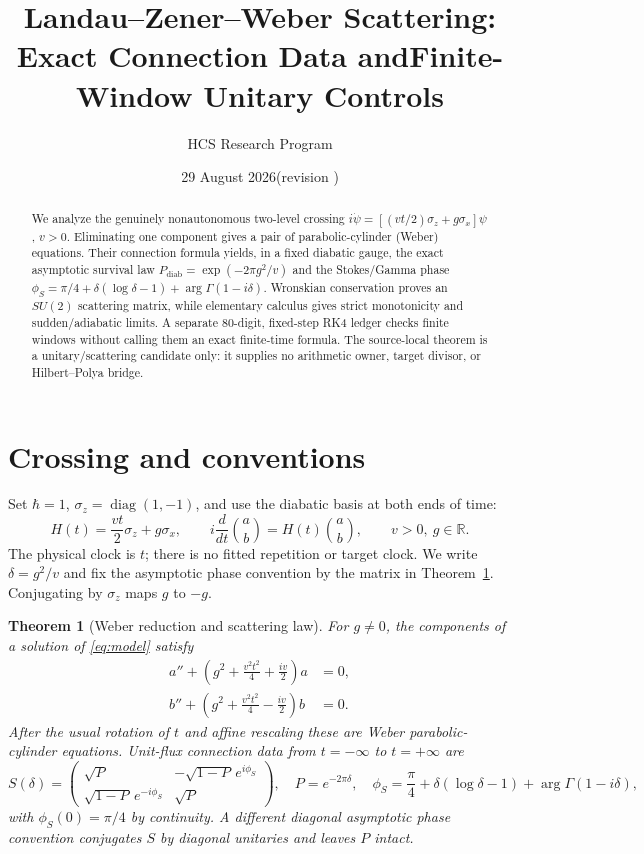 \documentclass[10pt]{article}
\title{Landau--Zener--Weber Scattering: Exact Connection Data and\newline Finite-Window Unitary Controls}
\author{HCS Research Program}
\date{29 August 2026\quad (revision \CRevisionRound)}
\newtheorem{theorem}{Theorem}
\newcommand{\diab}{\mathrm{diab}}
\begin{document}
\maketitle

\begin{abstract}
We analyze the genuinely nonautonomous two-level crossing
$i\dot\psi=[(vt/2)\sigma_z+g\sigma_x]\psi$, $v>0$.  Eliminating one
component gives a pair of parabolic-cylinder (Weber) equations.  Their
connection formula yields, in a fixed diabatic gauge, the exact asymptotic
survival law $P_\diab=\exp(-2\pi g^2/v)$ and the
Stokes/Gamma phase
$\phi_S=\pi/4+\delta(\log\delta-1)+\arg\Gamma(1-i\delta)$.
Wronskian conservation proves an $SU(2)$ scattering matrix, while elementary
calculus gives strict monotonicity and sudden/adiabatic limits.  A separate
80-digit, fixed-step RK4 ledger checks finite windows without calling them an
exact finite-time formula.  The source-local theorem is a unitary/scattering
candidate only: it supplies no arithmetic owner, target divisor, or
Hilbert--Polya bridge.
\end{abstract}

\section{Crossing and conventions}
Set $\hbar=1$, $\sigma_z=\operatorname{diag}(1,-1)$, and use the diabatic
basis at both ends of time:
\begin{equation}
 H(t)=\frac{vt}{2}\sigma_z+g\sigma_x,
 \qquad i\frac{d}{dt}\binom{a}{b}=H(t)\binom{a}{b},
 \qquad v>0,\ g\in\mathbb R .                         \label{eq:model}
\end{equation}
The physical clock is $t$; there is no fitted repetition or target clock.  We
write $\delta=g^2/v$ and fix the asymptotic phase convention by the matrix in
Theorem~\ref{thm:scattering}.  Conjugating by $\sigma_z$ maps $g$ to $-g$.

\begin{theorem}[Weber reduction and scattering law]\label{thm:scattering}
For $g\ne0$, the components of a solution of \eqref{eq:model} satisfy
\begin{align}
 a''+\left(g^2+\frac{v^2t^2}{4}+\frac{iv}{2}\right)a&=0,\\
 b''+\left(g^2+\frac{v^2t^2}{4}-\frac{iv}{2}\right)b&=0.               \label{eq:weber}
\end{align}
After the usual rotation of $t$ and affine rescaling these are Weber
parabolic-cylinder equations.  Unit-flux connection data from $t=-\infty$ to
$t=+\infty$ are
\begin{equation}
 S(\delta)=\begin{pmatrix}
 \sqrt P&-\sqrt{1-P}\,e^{i\phi_S}\\
 \sqrt{1-P}\,e^{-i\phi_S}&\sqrt P
 \end{pmatrix},\quad
 P=e^{-2\pi\delta},\quad
 \phi_S=\frac\pi4+\delta(\log\delta-1)+\arg\Gamma(1-i\delta),       \label{eq:S}
\end{equation}
with $\phi_S(0)=\pi/4$ by continuity.  A different diagonal asymptotic
phase convention conjugates $S$ by diagonal unitaries and leaves $P$ intact.
\end{theorem}
\end{document}
